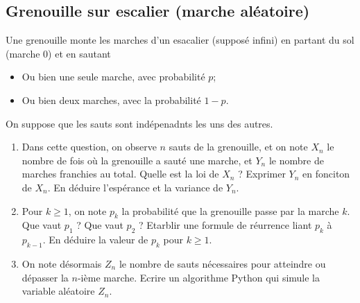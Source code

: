 \subsection{Grenouille sur escalier (marche aléatoire)}


\begin{exercice}
Une grenouille monte les marches d'un esacalier (supposé infini) en partant du sol (marche 0) et  en sautant 
\begin{itemize}
\item Ou bien une seule marche, avec probabilité $p$; 
\item Ou bien deux marches, avec la probabilité $1-p$.
\end{itemize}
On suppose que les sauts sont indépenadnts les uns des autres. 
\begin{enumerate}
\item Dans cette question, on observe $n$ sauts de la grenouille, et on note $X_n$ le nombre de fois où la grenouille a sauté une marche, et $Y_n$ le nombre de marches franchies au total. Quelle est la loi de $X_n$ ? Exprimer $Y_n$ en fonciton de $X_n$. En déduire l'espérance et la variance de $Y_n$. 
\item Pour $k\geq 1$, on note $p_k$ la probabilité que la grenouille passe par la marche $k$. Que vaut $p_1 $ ? Que vaut $p_2$ ? Etarblir une formule de réurrence liant $p_k$ à $p_{k-1}$. En déduire la valeur de $p_k$ pour $k\geq 1$. 
\item On note désormais $Z_n$ le nombre de sauts nécessaires pour atteindre ou dépasser la $n$-ième marche. Ecrire un algorithme Python qui simule la variable aléatoire $Z_n$. 
\end{enumerate}
\end{exercice}
